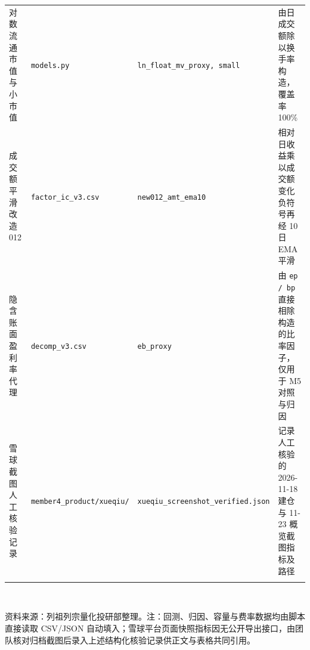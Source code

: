 \documentclass[12pt,a4paper]{article}
\newcommand{\exhibitnote}[1]{{\fontsize{7.5pt}{10pt}\selectfont\color{GrayNote}#1\par}}
\begin{document}
\begin{minipage}{\textwidth}
\begin{tabularx}{\textwidth}{@{}l l l X@{}}
  对数流通市值与小市值 & \texttt{models.py} & \texttt{ln\_float\_mv\_proxy, small} & 由日成交额除以换手率构造，覆盖率 100\% \\
  成交额平滑改造012 & \texttt{factor\_ic\_v3.csv} & \texttt{new012\_amt\_ema10} & 相对日收益乘以成交额变化负符号再经 10 日 EMA 平滑 \\
  隐含账面盈利率代理 & \texttt{decomp\_v3.csv} & \texttt{eb\_proxy} & 由 \texttt{ep / bp} 直接相除构造的比率因子，仅用于 M5 对照与归因 \\
  雪球截图人工核验记录 & \texttt{member4\_product/xueqiu/} & \texttt{xueqiu\_screenshot\_verified.json} & 记录人工核验的 2026-11-18 建仓与 11-23 概览截图指标及路径 \\
  \arrayrulecolor{Primary}\bottomrule[1.0pt]
\end{tabularx}\\[3pt]
\exhibitnote{资料来源：列祖列宗量化投研部整理。注：回测、归因、容量与费率数据均由脚本直接读取 CSV/JSON 自动填入；雪球平台页面快照指标因无公开导出接口，由团队核对归档截图后录入上述结构化核验记录供正文与表格共同引用。}
\end{minipage}
\end{document}
